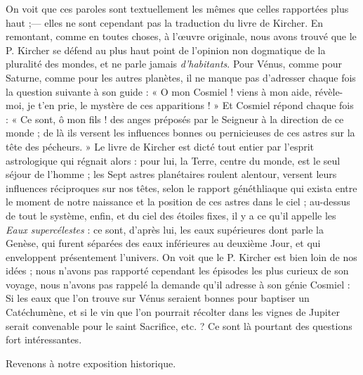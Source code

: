 \documentclass[a4paper, 11pt, oneside, landscape]{article}
\begin{document}
On voit que ces paroles sont textuellement les mêmes que celles rapportées plus haut ;--- elles ne sont cependant pas la traduction du livre de Kircher. En remontant, comme en toutes choses, à l'œuvre originale, nous avons trouvé que le P. Kircher se défend au plus haut point de l'opinion non dogmatique de la pluralité des mondes, et ne parle jamais \emph{d'habitants}. Pour Vénus, comme pour Saturne, comme pour les autres planètes, il ne manque pas d'adresser chaque fois la question suivante à son guide : « O mon Cosmiel ! viens à mon aide, révèle-moi, je t'en prie, le mystère de ces apparitions ! » Et Cosmiel répond chaque fois : « Ce sont, ô mon fils ! des anges préposés par le Seigneur à la direction de ce monde ; de là ils versent les influences bonnes ou pernicieuses de ces astres sur la tête des pécheurs. » Le livre de Kircher est dicté tout entier par l'esprit astrologique qui régnait alors : pour lui, la Terre, centre du monde, est le seul séjour de l'homme ; les Sept astres planétaires roulent alentour, versent leurs influences réciproques sur nos têtes, selon le rapport généthliaque qui exista entre le moment de notre naissance et la position de ces astres dans le ciel ; au-dessus de tout le système, enfin, et du ciel des étoiles fixes, il y a ce qu'il appelle les \emph{Eaux supercélestes} : ce sont, d'après lui, les eaux supérieures dont parle la Genèse, qui furent séparées des eaux inférieures au deuxième Jour, et qui enveloppent présentement l'univers. On voit que le P. Kircher est bien loin de nos idées ; nous n'avons pas rapporté cependant les épisodes les plus curieux de son voyage, nous n'avons pas rappelé la demande qu'il adresse à son génie Cosmiel : Si les eaux que l'on trouve sur Vénus seraient bonnes pour baptiser un Catéchumène, et si le vin que l'on pourrait récolter dans les vignes de Jupiter serait convenable pour le saint Sacrifice, etc. ? Ce sont là pourtant des questions fort intéressantes.

Revenons à notre exposition historique.
\end{document}
